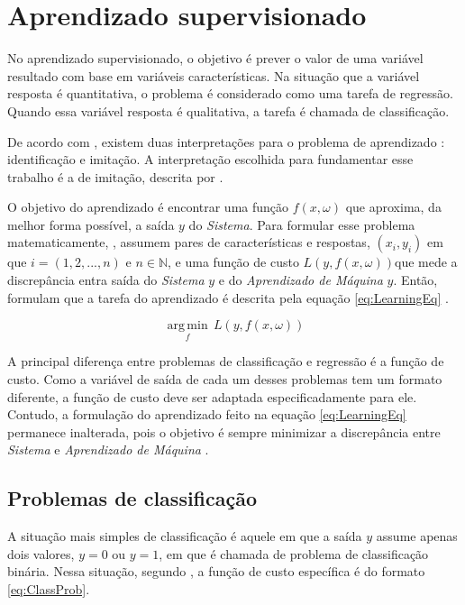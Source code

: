 \section{Aprendizado supervisionado}

No aprendizado supervisionado, o objetivo é prever o valor de uma variável resultado com base em variáveis características. Na situação que a variável resposta é quantitativa, o problema é considerado como uma tarefa de regressão. Quando essa variável resposta é qualitativa, a tarefa é chamada de classificação.

De acordo com , existem duas interpretações para o problema de aprendizado : identificação e imitação. A interpretação escolhida para fundamentar esse trabalho é a de imitação, descrita por .

O objetivo do aprendizado é encontrar uma função $f(x, \omega)$ que aproxima, da melhor forma possível, a saída $y$ do \textit{Sistema}. Para formular esse problema matematicamente, , assumem pares de características e respostas, $(x_i, y_i)$ em que $i = (1, 2, ..., n)$ e $ n \in \mathbb {N}$, e uma função de custo $L(y, f(x, \omega))$que mede a discrepância entra saída do \textit{Sistema} $y$ e do \textit{Aprendizado de Máquina} $\hat{y}$. Então, formulam que a tarefa do aprendizado é descrita pela equação \ref{eq:LearningEq} . 

\begin{equation}
{	
	{\displaystyle {\underset {f}{\operatorname {arg\,min} }}\, L(y, f(x, \omega))}
}
\label{eq:LearningEq}
\end{equation}

A principal diferença entre problemas de classificação e regressão é a função de custo. Como a variável de saída de cada um desses problemas tem um formato diferente, a função de custo deve ser adaptada especificadamente para ele. Contudo, a formulação do aprendizado feito na equação \ref{eq:LearningEq} permanece inalterada, pois o objetivo é sempre minimizar a discrepância entre \textit{Sistema} e \textit{Aprendizado de Máquina} \cite{Cherkassky2007}.

\subsection{Problemas de classificação}
A situação mais simples de classificação é aquele em que a saída $y$ assume apenas dois valores, $y = 0$ ou $y = 1$, em que é chamada de problema de classificação binária. Nessa situação, segundo , a função de custo específica é do formato \ref{eq:ClassProb}.

